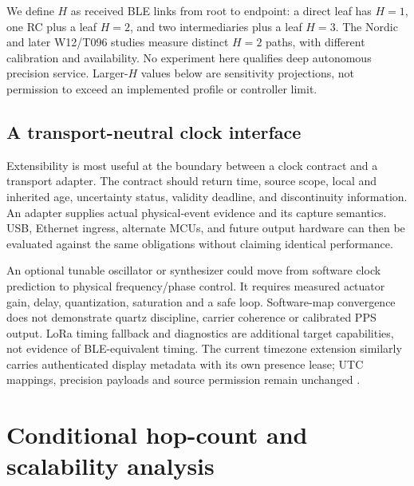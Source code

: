 \documentclass[11pt,letterpaper]{article}
\begin{document}
We define $H$ as received BLE links from root to endpoint: a direct leaf has $H=1$, one RC plus a leaf $H=2$, and two intermediaries plus a leaf $H=3$. The Nordic and later W12/T096 studies measure distinct $H=2$ paths, with different calibration and availability. No experiment here qualifies deep autonomous precision service. Larger-$H$ values below are sensitivity projections, not permission to exceed an implemented profile or controller limit.

\subsection{A transport-neutral clock interface}
Extensibility is most useful at the boundary between a clock contract and a transport adapter. The contract should return time, source scope, local and inherited age, uncertainty status, validity deadline, and discontinuity information. An adapter supplies actual physical-event evidence and its capture semantics. USB, Ethernet ingress, alternate MCUs, and future output hardware can then be evaluated against the same obligations without claiming identical performance.

An optional tunable oscillator or synthesizer could move from software clock prediction to physical frequency/phase control. It requires measured actuator gain, delay, quantization, saturation and a safe loop. Software-map convergence does not demonstrate quartz discipline, carrier coherence or calibrated PPS output. LoRa timing fallback and diagnostics are additional target capabilities, not evidence of BLE-equivalent timing. The current timezone extension similarly carries authenticated display metadata with its own presence lease; UTC mappings, precision payloads and source permission remain unchanged \cite{current}.

\section{Conditional hop-count and scalability analysis}\label{sec:scaling}
\end{document}
